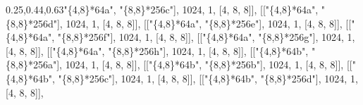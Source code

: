 \documentclass[
  10pt,
  letterpaper,
]{article}
\newenvironment{Shaded}{}{}
\newcommand{\FloatTok}[1]{\textcolor[rgb]{0.25,0.63,0.44}{#1}}
\newcommand{\NormalTok}[1]{#1}
\newcommand{\OperatorTok}[1]{\textcolor[rgb]{0.40,0.40,0.40}{#1}}
\newcommand{\StringTok}[1]{\textcolor[rgb]{0.25,0.44,0.63}{#1}}
\begin{document}
\begin{Shaded}
\begin{Highlighting}[]
\NormalTok{[[}\StringTok{"\{4,8\}*64a"}\OperatorTok{,} \StringTok{"\{8,8\}*256c"}\NormalTok{]}\OperatorTok{,} \FloatTok{1024}\OperatorTok{,} \FloatTok{1}\OperatorTok{,}\NormalTok{ [}\FloatTok{4}\OperatorTok{,} \FloatTok{8}\OperatorTok{,} \FloatTok{8}\NormalTok{]]}\OperatorTok{,}
\NormalTok{[[}\StringTok{"\{4,8\}*64a"}\OperatorTok{,} \StringTok{"\{8,8\}*256d"}\NormalTok{]}\OperatorTok{,} \FloatTok{1024}\OperatorTok{,} \FloatTok{1}\OperatorTok{,}\NormalTok{ [}\FloatTok{4}\OperatorTok{,} \FloatTok{8}\OperatorTok{,} \FloatTok{8}\NormalTok{]]}\OperatorTok{,}
\NormalTok{[[}\StringTok{"\{4,8\}*64a"}\OperatorTok{,} \StringTok{"\{8,8\}*256e"}\NormalTok{]}\OperatorTok{,} \FloatTok{1024}\OperatorTok{,} \FloatTok{1}\OperatorTok{,}\NormalTok{ [}\FloatTok{4}\OperatorTok{,} \FloatTok{8}\OperatorTok{,} \FloatTok{8}\NormalTok{]]}\OperatorTok{,}
\NormalTok{[[}\StringTok{"\{4,8\}*64a"}\OperatorTok{,} \StringTok{"\{8,8\}*256f"}\NormalTok{]}\OperatorTok{,} \FloatTok{1024}\OperatorTok{,} \FloatTok{1}\OperatorTok{,}\NormalTok{ [}\FloatTok{4}\OperatorTok{,} \FloatTok{8}\OperatorTok{,} \FloatTok{8}\NormalTok{]]}\OperatorTok{,}
\NormalTok{[[}\StringTok{"\{4,8\}*64a"}\OperatorTok{,} \StringTok{"\{8,8\}*256g"}\NormalTok{]}\OperatorTok{,} \FloatTok{1024}\OperatorTok{,} \FloatTok{1}\OperatorTok{,}\NormalTok{ [}\FloatTok{4}\OperatorTok{,} \FloatTok{8}\OperatorTok{,} \FloatTok{8}\NormalTok{]]}\OperatorTok{,}
\NormalTok{[[}\StringTok{"\{4,8\}*64a"}\OperatorTok{,} \StringTok{"\{8,8\}*256h"}\NormalTok{]}\OperatorTok{,} \FloatTok{1024}\OperatorTok{,} \FloatTok{1}\OperatorTok{,}\NormalTok{ [}\FloatTok{4}\OperatorTok{,} \FloatTok{8}\OperatorTok{,} \FloatTok{8}\NormalTok{]]}\OperatorTok{,}
\NormalTok{[[}\StringTok{"\{4,8\}*64b"}\OperatorTok{,} \StringTok{"\{8,8\}*256a"}\NormalTok{]}\OperatorTok{,} \FloatTok{1024}\OperatorTok{,} \FloatTok{1}\OperatorTok{,}\NormalTok{ [}\FloatTok{4}\OperatorTok{,} \FloatTok{8}\OperatorTok{,} \FloatTok{8}\NormalTok{]]}\OperatorTok{,}
\NormalTok{[[}\StringTok{"\{4,8\}*64b"}\OperatorTok{,} \StringTok{"\{8,8\}*256b"}\NormalTok{]}\OperatorTok{,} \FloatTok{1024}\OperatorTok{,} \FloatTok{1}\OperatorTok{,}\NormalTok{ [}\FloatTok{4}\OperatorTok{,} \FloatTok{8}\OperatorTok{,} \FloatTok{8}\NormalTok{]]}\OperatorTok{,}
\NormalTok{[[}\StringTok{"\{4,8\}*64b"}\OperatorTok{,} \StringTok{"\{8,8\}*256c"}\NormalTok{]}\OperatorTok{,} \FloatTok{1024}\OperatorTok{,} \FloatTok{1}\OperatorTok{,}\NormalTok{ [}\FloatTok{4}\OperatorTok{,} \FloatTok{8}\OperatorTok{,} \FloatTok{8}\NormalTok{]]}\OperatorTok{,}
\NormalTok{[[}\StringTok{"\{4,8\}*64b"}\OperatorTok{,} \StringTok{"\{8,8\}*256d"}\NormalTok{]}\OperatorTok{,} \FloatTok{1024}\OperatorTok{,} \FloatTok{1}\OperatorTok{,}\NormalTok{ [}\FloatTok{4}\OperatorTok{,} \FloatTok{8}\OperatorTok{,} \FloatTok{8}\NormalTok{]]}\OperatorTok{,}

\end{Highlighting}
\end{Shaded}
\end{document}
